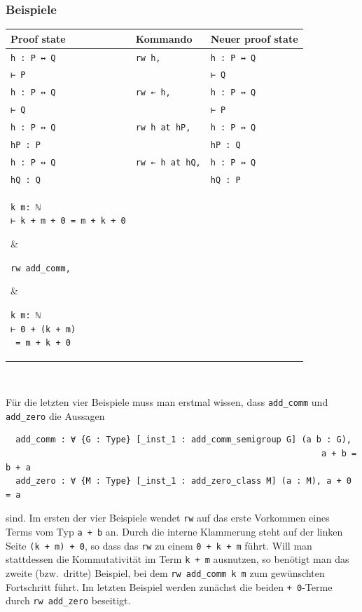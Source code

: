 \documentclass[11pt]{article}
\newcommand{\leanin}{\texttt}
\newcommand{\leanstate}{\texttt}
\newcommand{\leantable}[1]{
  \noindent
  \begin{tabular}{|p{0.36\textwidth}|p{0.28\textwidth}|p{0.3\textwidth}|}     \hline
    \vphantom{$\displaystyle\int$}
    \bf Proof state & \bf Kommando & \bf Neuer proof state \\ \hline \hline 
    #1
    \hline
  \end{tabular}
}
\newcommand{\rw}{\leanstate{h : P ↔ Q} & \leanin{rw h,} & \leanstate{h : P ↔ Q} \\ \leanstate{⊢ P} && \leanstate{⊢ Q} \\\hline 
\leanstate{h : P ↔ Q} & \leanin{rw ← h,} & \leanstate{h : P ↔ Q} \\ \leanstate{⊢ Q} && \leanstate{⊢ P} \\ \hline 
\leanstate{h : P ↔ Q} & \leanin{rw h at hP,} & \leanstate{h : P ↔ Q}  \\ \leanstate{hP : P} & & \leanstate{hP : Q}  \\ \hline 
\leanstate{h : P ↔ Q} & \leanin{rw ← h at hQ,} & \leanstate{h : P ↔ Q}  \\ \leanstate{hQ : Q} & & \leanstate{hQ : P}  \\}
\begin{document}
\subsubsection*{Beispiele}
\leantable{\rw  \hline
  \parbox[t]{}{\leanstate{k m: ℕ} \\ \leanstate{⊢ k + m + 0 = m + k + 0}} & \parbox[t]{0.28\textwidth}{\leanin{rw add_comm,}}  & \parbox[t]{0.3\textwidth}{\leanstate{k m: ℕ} \\ \leanstate{⊢ 0 + (k + m)} \\ \leanstate{           = m + k + 0}} \\ \hline
  \parbox[t]{0.36\textwidth}{\leanstate{k m: ℕ} \\ \leanstate{⊢ k + m + 0 = m + k + 0}} & \parbox[t]{0.28\textwidth}{\leanin{rw add_comm k m,}}  & \parbox[t]{0.3\textwidth}{\leanstate{⊢ m + k + 0} \\ \leanstate{        = m + k + 0}} \\ \hline
      \parbox[t]{0.36\textwidth}{\leanstate{k m: ℕ} \\ \leanstate{⊢ k + m + 0 = m + k + 0}} & \parbox[t]{0.28\textwidth}{\leanin{rw ← add_comm k m,}}  & \parbox[t]{0.3\textwidth}{\leanstate{⊢ k + m + 0 } \\ \leanstate{      = k + m + 0}} \\ \hline
  \parbox[t]{0.36\textwidth}{\leanstate{k m: ℕ} \\ \leanstate{⊢ k + m + 0 = m + k + 0}} & \parbox[t]{0.28\textwidth}{\leanin{rw [add_zero, } \\ \leanin{        add_zero,]}}  & \parbox[t]{0.3\textwidth}{\leanstate{k m: ℕ} \\ \leanstate{⊢ k + m = m + k}} \\ \hline
}

~~

\noindent Für die letzten vier Beispiele muss man erstmal wissen, dass \leanstate{add_comm} und  \leanstate{add_zero} die Aussagen
\begin{verbatim}
  add_comm : ∀ {G : Type} [_inst_1 : add_comm_semigroup G] (a b : G),
                                                               a + b = b + a
  add_zero : ∀ {M : Type} [_inst_1 : add_zero_class M] (a : M), a + 0 = a
\end{verbatim}
sind. Im ersten der vier Beispiele wendet \leanin{rw} auf das erste Vorkommen eines Terms vom Typ \leanstate{a + b} an. Durch die interne Klammerung steht auf der linken Seite \leanstate{(k + m) + 0}, so dass das \leanin{rw} zu einem \leanstate{0 + k + m} führt. Will man stattdessen die Kommutativität im Term \leanstate{k + m} ausnutzen, so benötigt man das zweite (bzw.\ dritte) Beispiel, bei dem \leanin{rw add_comm k m} zum gewünschten Fortschritt führt. Im letzten Beispiel werden zunächst die beiden \leanstate{+ 0}-Terme durch \leanin{rw add_zero} beseitigt. 
\end{document}
